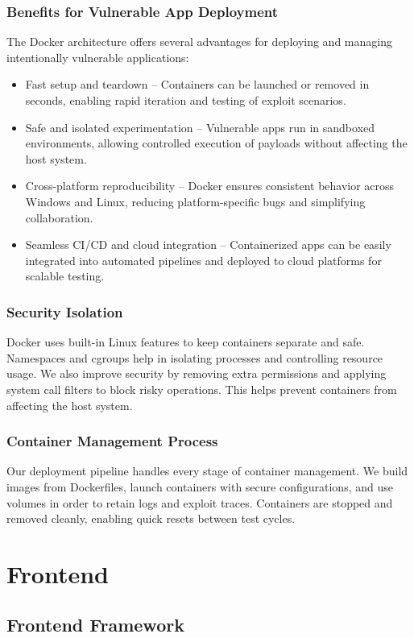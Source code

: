 \documentclass[12pt]{article}
\begin{document}
\subsubsection{Benefits for Vulnerable App Deployment}
The Docker architecture offers several advantages for deploying and managing intentionally vulnerable applications:
  \begin{itemize}
    \item {Fast setup and teardown} – Containers can be launched or removed in seconds, enabling rapid iteration and testing of exploit scenarios.
    \item {Safe and isolated experimentation} – Vulnerable apps run in sandboxed environments, allowing controlled execution of payloads without affecting the host system.
    \item {Cross-platform reproducibility} – Docker ensures consistent behavior across Windows and Linux, reducing platform-specific bugs and simplifying collaboration.
    \item {Seamless CI/CD and cloud integration} – Containerized apps can be easily integrated into automated pipelines and deployed to cloud platforms for scalable testing.
  \end{itemize}

\subsubsection{Security Isolation}
Docker uses built-in Linux features to keep containers separate and safe. Namespaces and cgroups help in isolating processes and controlling resource usage. We also improve security by removing extra permissions and applying system call filters to block risky operations. This helps prevent containers from affecting the host system.

\subsubsection{Container Management Process}
Our deployment pipeline handles every stage of container management. We build images from Dockerfiles, launch containers with secure configurations, and use volumes in order to retain logs and exploit traces. Containers are stopped and removed cleanly, enabling quick resets between test cycles.

\section{Frontend}
\subsection{Frontend Framework}
\end{document}
